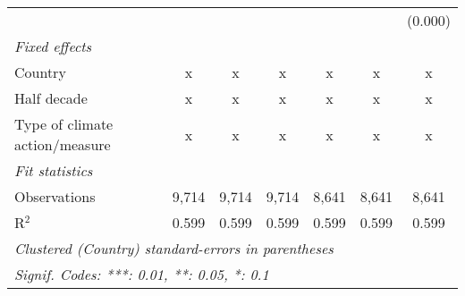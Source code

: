 \begin{tabular}{lcccccc}
                                            &         &         &         &              &              & (0.000)\\   
   \emph{Fixed effects}\\
   Country                                  & x       & x       & x       & x            & x            & x\\  
   Half decade                              & x       & x       & x       & x            & x            & x\\  
   Type of climate action/measure           & x       & x       & x       & x            & x            & x\\  
   \midrule \emph{Fit statistics}\\
   Observations                             & 9,714   & 9,714   & 9,714   & 8,641        & 8,641        & 8,641\\  
   R$^2$                                    & 0.599   & 0.599   & 0.599   & 0.599        & 0.599        & 0.599\\  
   \midrule
   \multicolumn{7}{l}{\emph{Clustered (Country) standard-errors in parentheses}}\\
   \multicolumn{7}{l}{\emph{Signif. Codes: ***: 0.01, **: 0.05, *: 0.1}}\\
\end{tabular}
\par\endgroup


